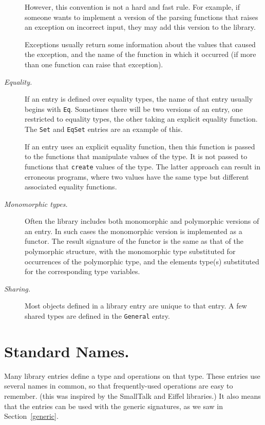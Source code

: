 \begin{description}
	However, this convention is not a hard and fast rule.  For example,
	if someone wants to implement a version of the parsing
	functions that raises an exception on incorrect input, they
	may add this version to the library.

	Exceptions usually return some information about the values that
	caused the exception, and the name of the function in which it
	occurred
	(if more than one function can raise that exception).

  \item[\em Equality.]
	If an entry is defined over equality types, the name of that entry
	usually begins with {\tt Eq}.  Sometimes there will be two
	versions of an entry, one restricted to equality types, the other
	taking an explicit equality function.  The {\tt Set} and
	{\tt EqSet} entries are an example of this.

	If an entry uses an explicit equality function, then this function
	is passed to the functions that manipulate values of the type.
	It is not passed to functions that {\tt create} values of the
	type.  The latter approach can result in erroneous programs,
	where two values have the same type but different associated
	equality functions.

  \item[\em Monomorphic types.]
	Often the library includes both monomorphic and polymorphic
	versions of an entry.  In such cases the monomorphic version
	is implemented as a functor.  The result signature of the functor
	is the same as that of the polymorphic structure, with the
	monomorphic type substituted for occurrences of the polymorphic
	type, and the elements type(s) substituted for the corresponding
	type variables.

  \item[\em Sharing.]
	Most objects defined in a library entry are unique to that entry.
	A few shared types are defined in the {\tt General} entry.
\end{description}


\section{Standard Names.}	\label{names}

Many library entries define a type and operations on that type.
These entries use several names in common, so that frequently-used
operations are easy to remember.  (this was inspired by the SmallTalk
and Eiffel libraries.)  It also means that the entries can be used with
the generic signatures, as we saw in Section~\ref{generic}.

